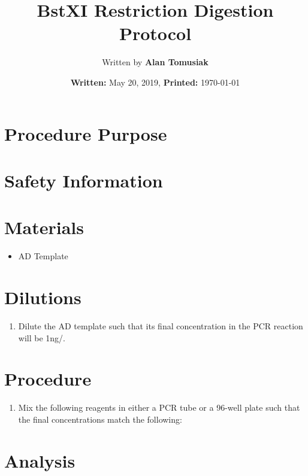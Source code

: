 \documentclass{ssiBio}
\title{BstXI Restriction Digestion Protocol}
\author{Written by \textbf{Alan Tomusiak}}
\date{\textbf{Written:} May 20, 2019, \textbf{Printed:} \today{}}
\begin{document}
\maketitle
\section{Procedure Purpose}


\section{Safety Information}
\begin{safety}
  \begin{enumerate}
    \SYBRGOLD
  \end{enumerate}
\end{safety}

\section{Materials}
\begin{itemize}
  \item{AD Template}
\end{itemize}

\section{Dilutions}
\begin{enumerate}
  \item{Dilute the AD template such that its final concentration in the PCR reaction will be 1ng/\uL.}
\end{enumerate}

\section{Procedure}
\begin{enumerate}
  \item{Mix the following reagents in either a PCR tube or a 96-well plate such that the final concentrations match the following:}

\end{enumerate}

\section{Analysis}



\end{document}
